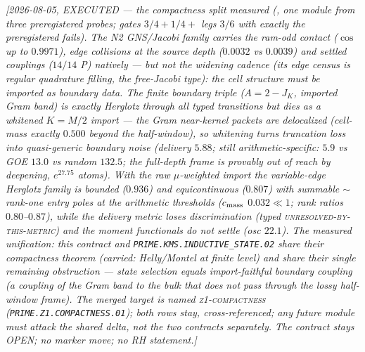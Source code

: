 \documentclass[11pt,a4paper]{article}
\begin{document}
\emph{[2026-08-05, EXECUTED --- the compactness split measured
(, one module from three
preregistered probes; gates $3/4+1/4+$ legs $3/6$ with exactly the
preregistered fails).  The N2 GNS/Jacobi family carries the
ram-odd contact ($\cos$ up to $0.9971$), edge collisions at the
source depth ($0.0032$ vs $0.0039$) and settled couplings
($14/14$ P) natively --- but \emph{not} the widening cadence (its
edge census is regular quadrature filling, the free-Jacobi type):
the cell structure must be imported as boundary data.  The finite
boundary triple ($A=2-J_K$, imported Gram band) is \emph{exactly}
Herglotz through all typed transitions but dies as a whitened
$K=M/2$ import --- the Gram near-kernel packets are delocalized
(cell-mass exactly $0.500$ beyond the half-window), so whitening
turns truncation loss into quasi-generic boundary noise (delivery
$5.88$; still arithmetic-specific: $5.9$ vs GOE $13.0$ vs random
$132.5$; the full-depth frame is provably out of reach by
deepening, $e^{27.75}$ atoms).  With the \emph{raw} $\mu$-weighted
import the variable-edge Herglotz family is \emph{bounded}
($0.936$) and \emph{equicontinuous} ($0.807$) with \emph{summable}
${\sim}$rank-one entry poles at the arithmetic thresholds
($c_{\rm mass}$ $0.032\ll1$; rank ratios $0.80$--$0.87$), while
the delivery metric loses discrimination (typed
\textsc{unresolved-by-this-metric}) and the moment functionals do
not settle (osc $22.1$).  \emph{The measured unification:} this
contract and \texttt{PRIME.KMS.INDUCTIVE\_STATE.02} \emph{share}
their compactness theorem (carried: Helly/Montel at finite level)
and \emph{share} their single remaining obstruction --- state
selection \emph{equals} import-faithful boundary coupling (a
coupling of the Gram band to the bulk that does not pass through
the lossy half-window frame).  The merged target is named
\textsc{z1-compactness} (\texttt{PRIME.Z1.COMPACTNESS.01}); both
rows stay, cross-referenced; any future module must attack the
shared delta, not the two contracts separately.  The contract
stays OPEN; no marker move; no RH statement.]}
\end{document}
